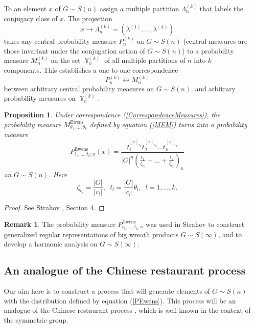 \documentclass[12pt]{amsart}
\newtheorem{prop}[thm]{Proposition}
\theoremstyle{definition}
\newtheorem{rem}[thm]{Remark}
\numberwithin{equation}{section}
\DeclareMathOperator{\Y}{\mathbb{Y}}
\DeclareMathOperator{\Ewens}{Ewens}
\begin{document}
To an element $x$ of $G\sim S(n)$ assign a multiple partition
$\Lambda_n^{(k)}$ that labels the conjugacy class of $x$. The projection
$$
x\longrightarrow\Lambda_n^{(k)}=\left(\lambda^{(1)},\ldots,\lambda^{(k)}\right)
$$
takes any central probability measure $P_n^{(k)}$ on $G\sim S(n)$
(central measures are those invariant under the conjugation action of $G\sim S(n)$) to a probability measure $M_n^{(k)}$
on the set  $\Y_n^{(k)}$ of all multiple partitions of $n$ into $k$ components.
This establishes a one-to-one correspondence
\begin{equation}\label{CorrespondenceMeasures}
P_n^{(k)}\longleftrightarrow M_n^{(k)}
\end{equation}
between arbitrary central probability measures on $G\sim S(n)$, and arbitrary probability measures on $\Y_n^{(k)}$.
\begin{prop}\label{PropositionCorMeasures}
Under correspondence (\ref{CorrespondenceMeasures}), the probability measure $M^{\Ewens}_{\theta_1,\ldots,\theta_k}$
defined by equation (\ref{MEM})
turns into a probability measure
\begin{equation}\label{PEwens}
P_{t_1,\ldots,t_k;n}^{\Ewens}(x)=\frac{t_1^{[x]_{c_1}}t_2^{[x]_{c_2}}\ldots t_k^{[x]_{c_k}}}{|G|^n\left(\frac{t_1}{\zeta_{c_1}}+\ldots+\frac{t_k}{\zeta_{c_k}}\right)_n}
\end{equation}
on $G\sim S(n)$. Here
$$
\zeta_{c_l}=\frac{|G|}{|c_l|},\;\; t_l=\frac{|G|}{|c_l|}\theta_l,\;\; l=1,\ldots,k.
$$
\end{prop}
\begin{proof} See Strahov \cite{StrahovMPS},
Section 4.
\end{proof}
\begin{rem} The probability measure $P_{t_1,\ldots,t_k;n}^{\Ewens}$ was used in Strahov
\cite{StrahovGRR} to construct generalized regular representations of big wreath products
$G\sim S(\infty)$, and to develop a harmonic analysis on $G\sim S(\infty)$.
\end{rem}
\subsection{An analogue of the Chinese restaurant process}
\label{SectionChinese2}

Our aim here is to construct a process that will generate elements of $G\sim S(n)$ with the distribution defined by equation (\ref{PEwens}).
This process will be an analogue of the Chinese
restaurant process \cite{Aldous}, which is well known in the context of
the symmetric group.
\end{document}

